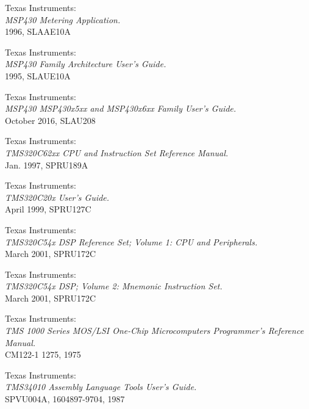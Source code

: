  Texas Instruments: \\
                   {\em MSP430 Metering Application.\/} \\
                   1996, SLAAE10A

 Texas Instruments: \\
                       {\em MSP430 Family Architecture User's Guide.\/} \\
                       1995, SLAUE10A

 Texas Instruments: \\
                 {\em MSP430 MSP430x5xx and MSP430x6xx Family
                  User's Guide.\/} \\
                 October 2016, SLAU208

 Texas Instruments: \\
                {\em TMS320C62xx CPU and Instruction Set Reference
                 Manual.\/} \\
                Jan. 1997, SPRU189A

 Texas Instruments: \\
                 {\em TMS320C20x User's Guide.\/} \\
                 April 1999, SPRU127C

 Texas Instruments: \\
                     {\em TMS320C54x DSP Reference Set;
                     Volume 1: CPU and Peripherals.\/} \\
                     March 2001, SPRU172C

 Texas Instruments: \\
                     {\em TMS320C54x DSP; Volume 2: Mnemonic Instruction
                     Set.\/} \\
                     March 2001, SPRU172C

 Texas Instruments: \\
                     {\em TMS 1000 Series MOS/LSI One-Chip
                     Microcomputers Programmer's Reference
                     Manual.\/} \\
                     CM122-1 1275, 1975

 Texas Instruments: \\
                     {\em TMS34010 Assembly Language Tools User's Guide.\/} \\
                     SPVU004A, 1604897-9704, 1987

